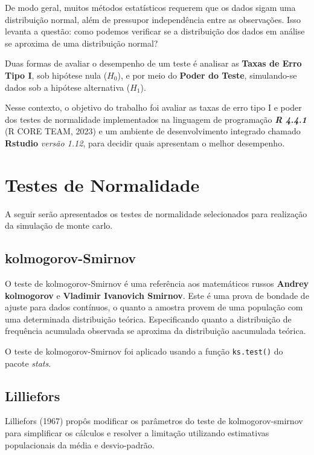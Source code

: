 \documentclass[a4paper,11pt]{article} %
\begin{document}
De modo geral, muitos métodos estatísticos requerem que os dados sigam uma distribuição normal, além de pressupor independência entre as observações. Isso levanta a questão: como podemos verificar se a distribuição dos dados em análise se aproxima de uma distribuição normal?\vskip0.3cm

Duas formas de avaliar o desempenho de um teste é analisar as \textbf{Taxas de Erro Tipo I}, sob hipótese nula ($H_0$), e por meio do \textbf{Poder do Teste}, simulando-se dados sob a hipótese alternativa ($H_1$). \vskip0.3cm

Nesse contexto, o objetivo do trabalho foi avaliar as taxas de erro tipo I e poder dos testes de normalidade implementados na linguagem de programação \textbf{\textit{R 4.4.1}} (R CORE TEAM, 2023) e um ambiente de desenvolvimento integrado chamado \textbf{Rstudio} \textit{versão 1.12}, para decidir quais apresentam o melhor desempenho.

\section{Testes de Normalidade}

A seguir serão apresentados os testes de normalidade selecionados para realização da simulação de monte carlo.

\subsection{kolmogorov-Smirnov}

O teste de kolmogorov-Smirnov é uma referência aos matemáticos russos \textbf{Andrey kolmogorov} e \textbf{Vladimir Ivanovich Smirnov}. Este é uma prova de bondade de ajuste para dados contínuos, o quanto a amostra provem de uma população com uma determinada distribuição teórica. Especificando quanto a distribuição de frequência acumulada observada se aproxima da distribuição aacumulada teórica.\vskip0.3cm

O teste de kolmogorov-Smirnov foi aplicado usando a função \texttt{ks.test()} do pacote \textit{stats}. \vskip0.3cm

\subsection{Lilliefors}

Lilliefors (1967) propôs modificar os parâmetros do teste de kolmogorov-smirnov para simplificar os cálculos e resolver a limitação utilizando estimativas populacionais da média e desvio-padrão.\vskip0.3cm
\end{document}
